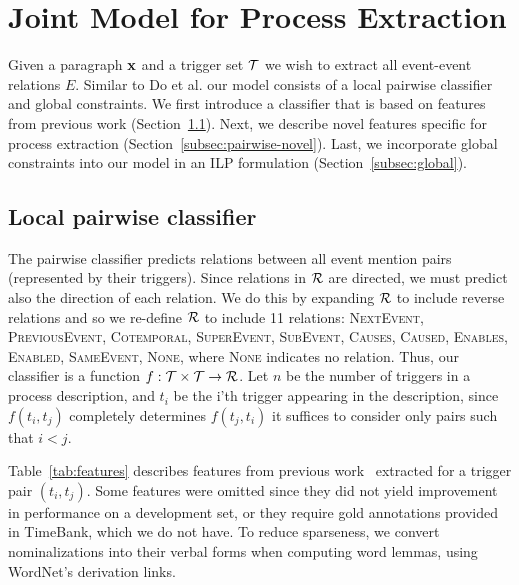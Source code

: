 \section{Joint Model for Process Extraction}

Given a paragraph $\mathbf{x}$ and a trigger set $\mathcal{T}$ we wish to extract all event-event relations $E$. Similar to Do et al.  our model consists of a local pairwise classifier and global constraints. We first introduce a classifier that is based on features from previous work (Section~\ref{subsec:pairwise}). Next, we describe novel features specific for process extraction (Section~\ref{subsec:pairwise-novel}). Last, we incorporate global constraints into our model in an ILP formulation (Section~\ref{subsec:global}).

\subsection{Local pairwise classifier} \label{subsec:pairwise}

The pairwise classifier predicts relations between all event mention pairs (represented by their triggers). Since relations in $\mathcal{R}$ are directed, we must predict also the direction of each relation. We do this by expanding $\mathcal{R}$ to include reverse relations and so we re-define $\mathcal{R}$ to include 11 relations: \textsc{NextEvent}, \textsc{PreviousEvent}, \textsc{Cotemporal}, \textsc{SuperEvent}, \textsc{SubEvent}, \textsc{Causes}, \textsc{Caused}, \textsc{Enables}, \textsc{Enabled}, \textsc{SameEvent}, \textsc{None}, where \textsc{None} indicates no relation. Thus, our classifier is a function $f:\mathcal{T} \times \mathcal{T} \rightarrow \mathcal{R}$. Let $n$ be the number of triggers in a process description, and $t_i$ be the i'th trigger appearing in the description, since $f(t_i,t_j)$ completely determines $f(t_j,t_i)$ it suffices to consider only pairs such that $i<j$.

Table~\ref{tab:features} describes features from previous work~\cite{Chambers08,Do12} extracted for a trigger pair $(t_i,t_j)$. Some features were omitted since they did not yield improvement in performance on a development set, or they require gold annotations provided in TimeBank, which we do not have. To reduce sparseness, we convert nominalizations into their verbal forms when computing word lemmas, using WordNet's \cite{Fellbaum1998} derivation links.


